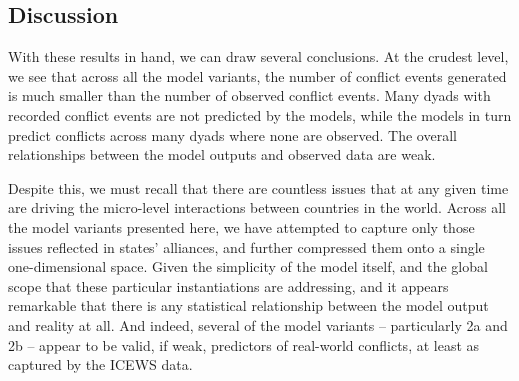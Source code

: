 
\subsection{Discussion}

With these results in hand, we can draw several conclusions. At the crudest level, we see that across all the model variants, the number of conflict events generated is much smaller than the number of observed conflict events. Many dyads with recorded conflict events are not predicted by the models, while the models in turn predict conflicts across many dyads where none are observed. The overall relationships between the model outputs and observed data are weak.

Despite this, we must recall that there are countless issues that at any given time are driving the micro-level interactions between countries in the world. Across all the model variants presented here, we have attempted to capture only those issues reflected in states' alliances, and further compressed them onto a single one-dimensional space. Given the simplicity of the model itself, and the global scope that these particular instantiations are addressing, and it appears remarkable that there is any statistical relationship between the model output and reality at all. And indeed, several of the model variants -- particularly 2a and 2b -- appear to be valid, if weak, predictors of real-world conflicts, at least as captured by the ICEWS data.

